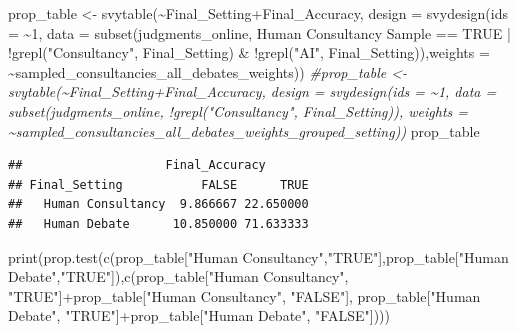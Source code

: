 \documentclass[
]{article}
\newenvironment{Shaded}{\begin{snugshade}}{\end{snugshade}}
\newcommand{\AttributeTok}[1]{\textcolor[rgb]{0.77,0.63,0.00}{#1}}
\newcommand{\CommentTok}[1]{\textcolor[rgb]{0.56,0.35,0.01}{\textit{#1}}}
\newcommand{\ConstantTok}[1]{\textcolor[rgb]{0.00,0.00,0.00}{#1}}
\newcommand{\DecValTok}[1]{\textcolor[rgb]{0.00,0.00,0.81}{#1}}
\newcommand{\FunctionTok}[1]{\textcolor[rgb]{0.00,0.00,0.00}{#1}}
\newcommand{\NormalTok}[1]{#1}
\newcommand{\OtherTok}[1]{\textcolor[rgb]{0.56,0.35,0.01}{#1}}
\newcommand{\SpecialCharTok}[1]{\textcolor[rgb]{0.00,0.00,0.00}{#1}}
\newcommand{\StringTok}[1]{\textcolor[rgb]{0.31,0.60,0.02}{#1}}
\begin{document}
\begin{Shaded}
\begin{Highlighting}[]
\NormalTok{prop\_table }\OtherTok{\textless{}{-}} \FunctionTok{svytable}\NormalTok{(}\SpecialCharTok{\textasciitilde{}}\NormalTok{Final\_Setting}\SpecialCharTok{+}\NormalTok{Final\_Accuracy, }\AttributeTok{design =} \FunctionTok{svydesign}\NormalTok{(}\AttributeTok{ids =} \SpecialCharTok{\textasciitilde{}}\DecValTok{1}\NormalTok{, }\AttributeTok{data =} \FunctionTok{subset}\NormalTok{(judgments\_online, }\StringTok{\textasciigrave{}}\AttributeTok{Human Consultancy Sample}\StringTok{\textasciigrave{}} \SpecialCharTok{==} \ConstantTok{TRUE} \SpecialCharTok{|} \SpecialCharTok{!}\FunctionTok{grepl}\NormalTok{(}\StringTok{"Consultancy"}\NormalTok{, Final\_Setting) }\SpecialCharTok{\&} \SpecialCharTok{!}\FunctionTok{grepl}\NormalTok{(}\StringTok{"AI"}\NormalTok{, Final\_Setting)),}\AttributeTok{weights =} \SpecialCharTok{\textasciitilde{}}\NormalTok{sampled\_consultancies\_all\_debates\_weights))}
\CommentTok{\#prop\_table \textless{}{-} svytable(\textasciitilde{}Final\_Setting+Final\_Accuracy, design = svydesign(ids = \textasciitilde{}1, data = subset(judgments\_online, !grepl("Consultancy", Final\_Setting)), weights = \textasciitilde{}sampled\_consultancies\_all\_debates\_weights\_grouped\_setting))}
\NormalTok{prop\_table}
\end{Highlighting}
\end{Shaded}

\begin{verbatim}
##                    Final_Accuracy
## Final_Setting           FALSE      TRUE
##   Human Consultancy  9.866667 22.650000
##   Human Debate      10.850000 71.633333
\end{verbatim}

\begin{Shaded}
\begin{Highlighting}[]
\FunctionTok{print}\NormalTok{(}\FunctionTok{prop.test}\NormalTok{(}\FunctionTok{c}\NormalTok{(prop\_table[}\StringTok{"Human Consultancy"}\NormalTok{,}\StringTok{"TRUE"}\NormalTok{],prop\_table[}\StringTok{"Human Debate"}\NormalTok{,}\StringTok{"TRUE"}\NormalTok{]),}\FunctionTok{c}\NormalTok{(prop\_table[}\StringTok{"Human Consultancy"}\NormalTok{, }\StringTok{"TRUE"}\NormalTok{]}\SpecialCharTok{+}\NormalTok{prop\_table[}\StringTok{"Human Consultancy"}\NormalTok{, }\StringTok{"FALSE"}\NormalTok{], prop\_table[}\StringTok{"Human Debate"}\NormalTok{, }\StringTok{"TRUE"}\NormalTok{]}\SpecialCharTok{+}\NormalTok{prop\_table[}\StringTok{"Human Debate"}\NormalTok{, }\StringTok{"FALSE"}\NormalTok{])))}
\end{Highlighting}
\end{Shaded}
\end{document}
